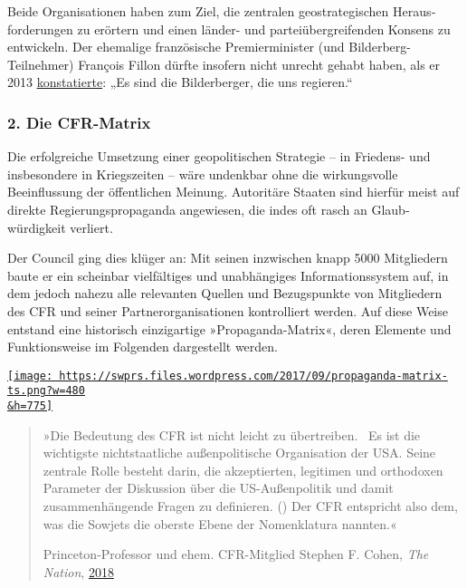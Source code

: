 Beide Organisationen haben zum Ziel, die zentralen geostrategischen
Heraus­forderungen zu erörtern und einen länder- und
partei­über­greifenden Konsens zu entwickeln. Der ehemalige französische
Premier­­minister (und Bilderberg-Teilnehmer) François Fillon dürfte
insofern nicht unrecht gehabt haben, als er 2013
\href{https://swprs.org/video-bilderberg-gruppe/}{konstatierte}: „Es
sind die Bilderberger, die uns regieren.``

\hypertarget{2-die-cfr-matrix}{%
\subsubsection{2. Die CFR-Matrix}\label{2-die-cfr-matrix}}

Die erfolgreiche Umsetzung einer geopolitischen Strategie -- in
Friedens- und insbesondere in Kriegszeiten -- wäre undenkbar ohne die
wirkungsvolle Beeinflussung der öffentlichen Meinung. Autoritäre Staaten
sind hierfür meist auf direkte Regierungs­propaganda angewiesen, die
indes oft rasch an Glaub­würdigkeit verliert.

Der Council ging dies klüger an: Mit seinen inzwischen knapp 5000
Mitgliedern baute er ein scheinbar vielfältiges und unabhängiges
Informations­system auf, in dem jedoch nahezu alle relevanten Quellen
und Bezugspunkte von Mitgliedern des CFR und seiner
Partner­organisationen kontrolliert werden. Auf diese Weise entstand
eine historisch einzigartige »Propaganda-Matrix«, deren Elemente und
Funktionsweise im Folgenden dargestellt werden.

\href{https://swprs.files.wordpress.com/2017/09/propaganda-matrix-ts.png}{\texttt{[image: https://swprs.files.wordpress.com/2017/09/propaganda-matrix-ts.png?w=480\\\&h=775]}}

\begin{quote}
»Die Bedeutung des CFR ist nicht leicht zu übertreiben.~ Es ist die
wichtigste nichtstaatliche außenpolitische Organisation der USA. Seine
zentrale Rolle besteht darin, die akzeptierten, legitimen und orthodoxen
Parameter der Diskussion über die US-Außenpolitik und damit
zusammenhängende Fragen zu definieren. () Der CFR entspricht also dem,
was die Sowjets die oberste Ebene der Nomenklatura nannten.«

Princeton-Professor und ehem. CFR-Mitglied Stephen F. Cohen, \emph{The
Nation},
\href{https://www.thenation.com/article/the-american-bipartisan-policy-establishment-declares-its-second-cold-war-vs-russia-after-years-of-denying-it/}{2018}
\end{quote}


